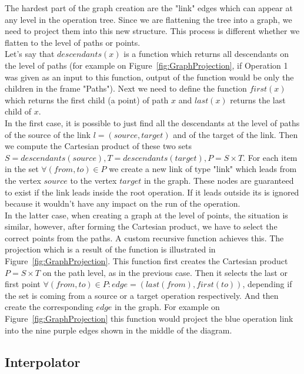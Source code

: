 The hardest part of the graph creation are the "link" edges which can appear at any level in the operation tree. Since we are flattening the tree into a graph, we need to project them into this new structure. 
This process is different whether we flatten to the level of paths or points.  \\

Let’s say that $descendants(x)$ is a function which returns all descendants on the level of paths (for example on Figure~\ref{fig:GraphProjection}, if Operation 1 was given as an input to this function, output of the function would be only the children in the frame "Paths"). Next we need to define the function $first(x)$ which returns the first child (a point) of path $x$ and $last(x)$ returns the last child of $x$.\\

In the first case, it is possible to just find all the descendants at the level of paths of the source of the link $l = (source, target)$ and of the target of the link.
Then we compute the Cartesian product of these two sets $S = descendants(source), T = descendants(target), P = S \times T$. 
For each item in the set $\forall (from, to) \in P$ we create a new link of type "link" which leads from the vertex $source$ to the vertex $target$ in the graph. 
These nodes are guaranteed to exist if the link leads inside the root operation. 
If it leads outside its is ignored because it wouldn't have any impact on the run of the operation. \\

In the latter case, when creating a graph at the level of points, the situation is similar, however, after forming the Cartesian product, we have to select the correct points from the paths. A custom recursive function  achieves this. The projection which is a result of the function is illustrated in Figure~\ref{fig:GraphProjection}. This function first creates the Cartesian product $P = S \times T$ on the path level, as in the previous case. Then it selects the last or first point $\forall (from, to) \in P: edge = (last(from), first(to))$, depending if the set is coming from a source or a target operation respectively. And then create the corresponding $edge$ in the graph. For example on Figure~\ref{fig:GraphProjection} this function would project the blue operation link into the nine purple edges shown in the middle of the diagram.

\subsection{Interpolator}

